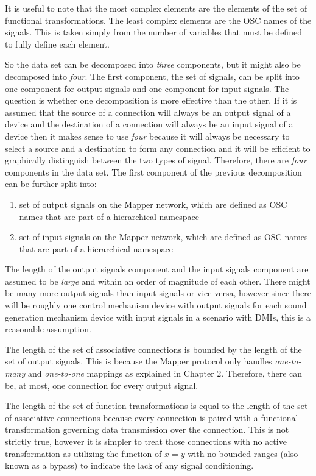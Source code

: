 It is useful to note that the most complex elements are the elements of the set of functional transformations. The least complex elements are the OSC names of the signals. This is taken simply from the number of variables that must be defined to fully define each element.

So the data set can be decomposed into \emph{three} components, but it might also be decomposed into \emph{four}. The first component, the set of signals, can be split into one component for output signals and one component for input signals. The question is whether one decomposition is more effective than the other. If it is assumed that the source of a connection will always be an output signal of a device and the destination of a connection will always be an input signal of a device then it makes sense to use \emph{four} because it will always be necessary to select a source and a destination to form any connection and it will be efficient to graphically distinguish between the two types of signal. Therefore, there are \emph{four} components in the data set. The first component of the previous decomposition can be further split into:

\begin{enumerate}
\item set of output signals on the Mapper network, which are defined as OSC names that are part of a hierarchical namespace
\item set of input signals on the Mapper network, which are defined as OSC names that are part of a hierarchical namespace
\end{enumerate}

The length of the output signals component and the input signals component are assumed to be \emph{large} and within an order of magnitude of each other. There might be many more output signals than input signals or vice versa, however since there will be roughly one control mechanism device with output signals for each sound generation mechanism device with input signals in a scenario with DMIs, this is a reasonable assumption.

The length of the set of associative connections is bounded by the length of the set of output signals. This is because the Mapper protocol only handles \emph{one-to-many} and \emph{one-to-one} mappings as explained in Chapter 2. Therefore, there can be, at most, one connection for every output signal.

The length of the set of function transformations is equal to the length of the set of associative connections because every connection is paired with a functional transformation governing data transmission over the connection. This is not strictly true, however it is simpler to treat those connections with no active transformation as utilizing the function of \begin{math}x = y\end{math} with no bounded ranges (also known as a bypass) to indicate the lack of any signal conditioning.  

